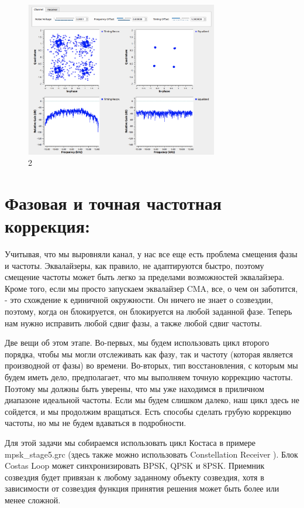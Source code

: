 \documentclass[10pt,a4paper,oneside]{article}
\begin{document}
\begin{figure}[H]
        \centering
        \includegraphics[width=0.75\textwidth]{pics/20.png}
        \caption{2}
        \label{fig:first}
\end{figure}

\section{Фазовая и точная частотная коррекция:}

Учитывая, что мы выровняли канал, у нас все еще есть проблема смещения фазы и частоты. Эквалайзеры, как правило, не адаптируются быстро, поэтому смещение частоты может быть легко за пределами возможностей эквалайзера. Кроме того, если мы просто запускаем эквалайзер CMA, все, о чем он заботится, - это схождение к единичной окружности. Он ничего не знает о созвездии, поэтому, когда он блокируется, он блокируется на любой заданной фазе. Теперь нам нужно исправить любой сдвиг фазы, а также любой сдвиг частоты.

Две вещи об этом этапе. Во-первых, мы будем использовать цикл второго порядка, чтобы мы могли отслеживать как фазу, так и частоту (которая является производной от фазы) во времени. Во-вторых, тип восстановления, с которым мы будем иметь дело, предполагает, что мы выполняем точную коррекцию частоты. Поэтому мы должны быть уверены, что мы уже находимся в приличном диапазоне идеальной частоты. Если мы будем слишком далеко, наш цикл здесь не сойдется, и мы продолжим вращаться. Есть способы сделать грубую коррекцию частоты, но мы не будем вдаваться в подробности.

Для этой задачи мы собираемся использовать цикл Костаса в примере mpsk_stage5.grc (здесь также можно использовать Constellation Receiver ). Блок Costas Loop может синхронизировать BPSK, QPSK и 8PSK. Приемник созвездия будет привязан к любому заданному объекту созвездия, хотя в зависимости от созвездия функция принятия решения может быть более или менее сложной.
\end{document}
